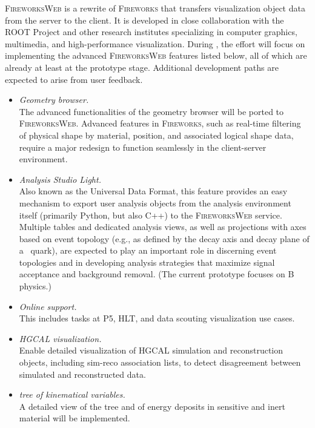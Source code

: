 \textsc{FireworksWeb} is a rewrite of \textsc{Fireworks} that transfers visualization object data from the server to the client. It is developed in close collaboration with the \textsc{ROOT} Project and other research institutes specializing in computer graphics, multimedia, and high-performance visualization. During \LSThree, the effort will focus on implementing the advanced \textsc{FireworksWeb} features listed below, all of which are already at least at the prototype stage. Additional development paths are expected to arise from user feedback.

\begin{itemize}
\item {\em Geometry browser.} \\ 
The advanced functionalities of the geometry browser will be ported to \textsc{FireworksWeb}. Advanced features in \textsc{Fireworks}, such as real-time filtering of physical shape by material, position, and associated logical shape data, require a major redesign to function seamlessly in the client-server environment.

\item {\em Analysis Studio Light.} \\
Also known as the Universal Data Format, this feature provides an easy mechanism to export user analysis objects from the analysis environment itself (primarily Python, but also C++) to the \textsc{FireworksWeb} service. Multiple tables and dedicated analysis views, as well as projections with axes based on event topology (e.g., as defined by the decay axis and decay plane of a \cPqb\ quark), are expected to play an important role in discerning event topologies and in developing analysis strategies that maximize signal acceptance and background removal. (The current prototype focuses on B physics.)

\item {\em Online support.} \\
This includes tasks at P5, \gls{HLT}, and data scouting visualization use cases.

\item {\em \gls{HGCAL} visualization.} \\
Enable detailed visualization of \gls{HGCAL} simulation and reconstruction objects, including sim-reco association lists, to detect disagreement between simulated and reconstructed data.

\item {\em \GEANTfour tree of kinematical variables.} \\ 
A detailed view of the tree and of energy deposits in sensitive and inert material will be implemented. 


\end{itemize}

